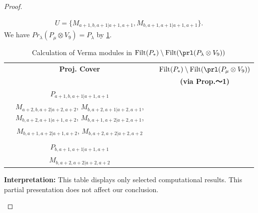 \begin{proof}
\begin{enumerate}
\begin{enumerate}
\begin{equation}
\begin{aligned}
    U = \{
M_{a+1,b,a+1|a+1,a+1},
M_{b,a+1,a+1|a+1,a+1}
\}.
  \end{aligned}
\end{equation}
       We have $Pr_{\lambda}(P_\mu \otimes V_{9}) = P_\lambda  $ by \cref{tab:verma-analysis_f_8}.
\begin{table}[htbp]
\centering
\caption{Calculation of Verma modules in $\operatorname{Filt}(P_*) \setminus \operatorname{Filt}(\prl(P_\lambda \otimes V_{9})) $ } \label{tab:verma-analysis_f_8}
\begin{tabular}{cc}
\toprule
\textbf{Proj. Cover} & \textbf{$\operatorname{Filt}(P_*) \setminus \operatorname{Filt}(\prl(P_\mu \otimes V_{9})) $}  \\
     & \textbf{(via Prop.～1)}  \\
\midrule
 $P_{a+1,b,a+1|a+1,a+1}$ & \makecell{
 $M_{a+2,b,a+1|a+2,a+1}$,
 $M_{a+2,b,a+1|a+1,a+2}$,
 $M_{a+1,b,a+2|a+2,a+1}$,
 $M_{a+1,b,a+2|a+1,a+2}$, \\
 $M_{a+2,b,a+2|a+2,a+2}$,
 $M_{b,a+2,a+1|a+2,a+1}$,
 $M_{b,a+2,a+1|a+1,a+2}$,
 $M_{b,a+1,a+2|a+2,a+1}$, \\
 $M_{b,a+1,a+2|a+1,a+2}$,
 $M_{b,a+2,a+2|a+2,a+2}$
}\\
 & \\
 $P_{b,a+1,a+1|a+1,a+1}$ & \makecell{
 $M_{b,a+2,a+1|a+2,a+1}$,
 $M_{b,a+2,a+1|a+1,a+2}$,
 $M_{b,a+1,a+2|a+2,a+1}$,
 $M_{b,a+1,a+2|a+1,a+2}$, \\
 $M_{b,a+2,a+2|a+2,a+2}$
}\\
\bottomrule
\end{tabular}
\vspace{0.5em}
\parbox{\linewidth}{\small
\textbf{Interpretation:}
This table displays only selected computational results. This partial presentation does not affect our conclusion.
}
\end{table}


\end{enumerate}
\end{enumerate}
\end{proof}
